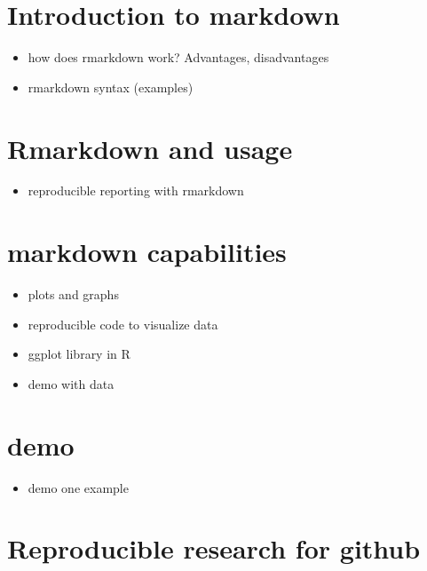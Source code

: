 \documentclass[]{book}
\providecommand{\tightlist}{%
  \setlength{\itemsep}{0pt}\setlength{\parskip}{0pt}}
\begin{document}
\hypertarget{introduction-to-markdown}{%
\chapter{Introduction to markdown}\label{introduction-to-markdown}}

\begin{itemize}
\tightlist
\item
  how does rmarkdown work? Advantages, disadvantages
\item
  rmarkdown syntax (examples)
\end{itemize}

\hypertarget{rmarkdown-and-usage}{%
\chapter{Rmarkdown and usage}\label{rmarkdown-and-usage}}

\begin{itemize}
\tightlist
\item
  reproducible reporting with rmarkdown
\end{itemize}

\hypertarget{markdown-capabilities}{%
\chapter{markdown capabilities}\label{markdown-capabilities}}

\begin{itemize}
\tightlist
\item
  plots and graphs
\item
  reproducible code to visualize data
\item
  ggplot library in R
\item
  demo with data
\end{itemize}

\hypertarget{demo}{%
\chapter{demo}\label{demo}}

\begin{itemize}
\tightlist
\item
  demo one example
\end{itemize}

\hypertarget{reproducible-research-for-github}{%
\chapter{Reproducible research for github}\label{reproducible-research-for-github}}
\end{document}
